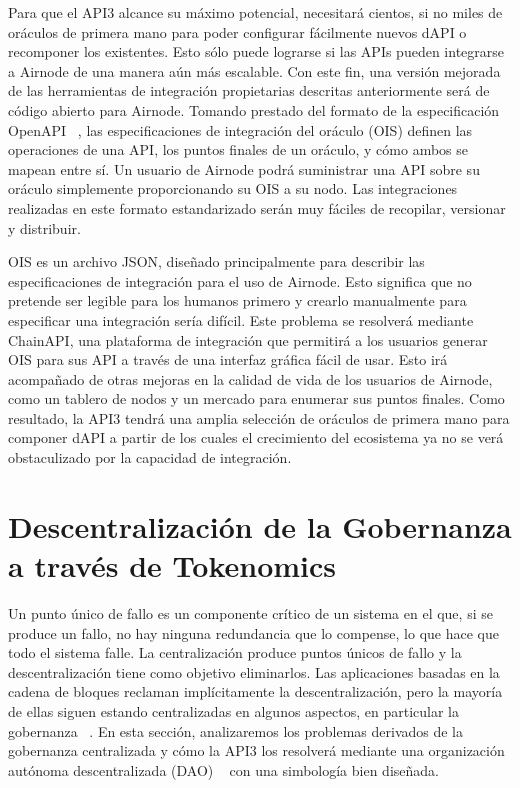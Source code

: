\documentclass[11pt]{article}
\begin{document}
Para que el API3 alcance su máximo potencial, necesitará cientos, si no miles de oráculos de primera mano para poder configurar fácilmente nuevos dAPI o recomponer los existentes. Esto sólo puede lograrse si las APIs pueden integrarse a Airnode de una manera aún más escalable. Con este fin, una versión mejorada de las herramientas de integración propietarias descritas anteriormente será de código abierto para Airnode. Tomando prestado del formato de la especificación OpenAPI ~\cite{oas}, las especificaciones de integración del oráculo (OIS) definen las operaciones de una API, los puntos finales de un oráculo, y cómo ambos se mapean entre sí.  Un usuario de Airnode podrá suministrar una API sobre su oráculo simplemente proporcionando su OIS a su nodo. Las integraciones realizadas en este formato estandarizado serán muy fáciles de recopilar, versionar y distribuir.

OIS es un archivo JSON, diseñado principalmente para describir las especificaciones de integración para el uso de Airnode. Esto significa que no pretende ser legible para los humanos primero y crearlo manualmente para especificar una integración sería difícil. Este problema se resolverá mediante ChainAPI, una plataforma de integración que permitirá a los usuarios generar OIS para sus API a través de una interfaz gráfica fácil de usar. Esto irá acompañado de otras mejoras en la calidad de vida de los usuarios de Airnode, como un tablero de nodos y un mercado para enumerar sus puntos finales. Como resultado, la API3 tendrá una amplia selección de oráculos de primera mano para componer dAPI a partir de los cuales el crecimiento del ecosistema ya no se verá obstaculizado por la capacidad de integración.

\section{Descentralización de la Gobernanza a través de Tokenomics}
\label{sec:decentralizing-governance-through-tokenomics}

Un punto único de fallo es un componente crítico de un sistema en el que, si se produce un fallo, no hay ninguna redundancia que lo compense, lo que hace que todo el sistema falle. La centralización produce puntos únicos de fallo y la descentralización tiene como objetivo eliminarlos. Las aplicaciones basadas en la cadena de bloques reclaman implícitamente la descentralización, pero la mayoría de ellas siguen estando centralizadas en algunos aspectos, en particular la gobernanza ~\cite{Walch:2019}.
En esta sección, analizaremos los problemas derivados de la gobernanza centralizada y cómo la API3 los resolverá mediante una organización autónoma descentralizada (DAO) ~\cite{buterin:2014b} con una simbología bien diseñada.
\end{document}
